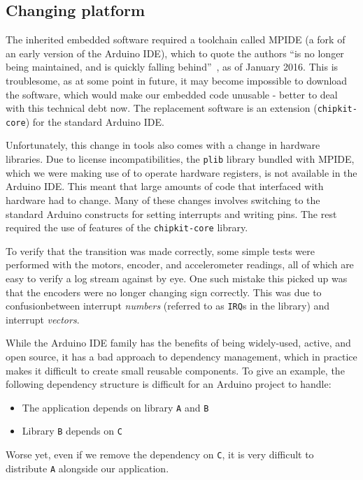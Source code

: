 \documentclass[main.tex]{subfiles}
\begin{document}
\subsection{Changing platform}
\label{sec:platformio}

	The inherited embedded software required a toolchain called MPIDE (a fork of an early version of the Arduino IDE), which to quote the authors \enquote{is no longer being maintained, and is quickly falling behind}~\cite{ mpide}, as of January 2016. This is troublesome, as at some point in future, it may become impossible to download the software, which would make our embedded code unusable - better to deal with this technical debt now. The replacement software is an extension (\texttt{chipkit-core}) for the standard Arduino IDE.

	Unfortunately, this change in tools also comes with a change in hardware libraries.
	Due to license incompatibilities, the \texttt{plib} library bundled with MPIDE, which we were making use of to operate hardware registers, is not available in the Arduino IDE.
	This meant that large amounts of code that interfaced with hardware had to change. Many of these changes involves switching to the standard Arduino constructs for setting interrupts and writing pins.
	The rest required the use of features of the \texttt{chipkit-core} library.

	To verify that the transition was made correctly, some simple tests were performed with the motors, encoder, and accelerometer readings, all of which are easy to verify a log stream against by eye. One such mistake this picked up was that the encoders were no longer changing sign correctly.
	This was due to confusion\footnotemark between interrupt \emph{numbers} (referred to as \texttt{IRQ}s in the library) and interrupt \emph{vectors}.


	While the Arduino IDE family has the benefits of being widely-used, active, and open source, it has a bad approach to dependency management, which in practice makes it difficult to create small reusable components.
	To give an example, the following dependency structure is difficult for an Arduino project to handle:
	\begin{itemize}[noitemsep]
		\item The application depends on library \texttt{A} and \texttt{B}
		\item Library \texttt{B} depends on \texttt{C}
	\end{itemize}
	Worse yet, even if we remove the dependency on \texttt{C}, it is very difficult to distribute \texttt{A} alongside our application.
\end{document}
